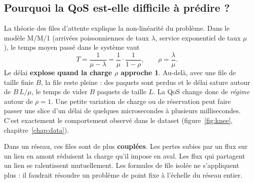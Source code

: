 \subsection{Pourquoi la QoS est-elle difficile à prédire ?}
La théorie des files d'attente explique la non-linéarité du problème. Dans le modèle M/M/1 (arrivées poissonniennes de taux $\lambda$, service exponentiel de taux $\mu$), le temps moyen passé dans le système vaut~\cite{kleinrock}
\begin{equation}
T=\frac{1}{\mu-\lambda}=\frac{1}{\mu}\cdot\frac{1}{1-\rho},\qquad \rho=\frac{\lambda}{\mu}.
\end{equation}
Le délai \textbf{explose quand la charge $\rho$ approche 1}. Au-delà, avec une file de taille finie $B$, la file reste pleine : des paquets sont perdus et le délai sature autour de $B\,L/\mu$, le temps de vider $B$ paquets de taille $L$. La QoS change donc de \emph{régime} autour de $\rho=1$. Une petite variation de charge ou de réservation peut faire passer une slice d'un délai de quelques microsecondes à plusieurs millisecondes. C'est exactement le comportement observé dans le dataset (figure~\ref{fig:knee}, chapitre~\ref{chap:data}).

Dans un réseau, ces files sont de plus \textbf{couplées}. Les pertes subies par un flux sur un lien en amont réduisent la charge qu'il impose en aval. Les flux qui partagent un lien se ralentissent mutuellement. Les formules de file isolée ne s'appliquent plus : il faudrait résoudre un problème de point fixe à l'échelle du réseau entier.

